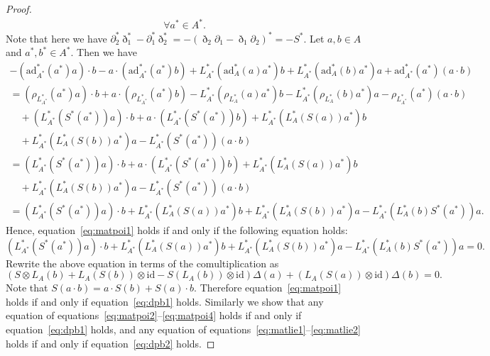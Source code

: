 \documentclass[pdftex]{sigma}
\numberwithin{equation}{section}
\newcommand{\ad}{\mathrm{ad}}
\newcommand{\id}{\mathrm{id}}
\begin{document}
\begin{proof}
\begin{gather*}
 \forall a^* \in A^*.
 \end{gather*}
	Note that here we have $\partial_2^* \eth_1^* - \partial_1^* \eth_2^* = - (\eth_2 \partial_1 - \eth_1 \partial_2)^* = -S^*$.
 Let $a, b \in A$ and $a^*, b^* \in A^*$.
 Then we have
 \begin{gather*}
 -(\ad^*_{A^*}(a^*) a) \cdot b - a \cdot (\ad^*_{A^*}(a^*) b) + L^*_{A^*}(\ad^*_{A}(a)a^*)b + L^*_{A^*}(\ad^*_{A}(b)a^*) a + \ad^*_{A^*}(a^*)(a \cdot b) \\
 = (\rho_{L^*_{A^*}}(a^*) a) \cdot b + a \cdot (\rho_{L^*_{A^*}}(a^*) b) - L^*_{A^*}(\rho_{L^*_A}(a)a^*)b - L^*_{A^*}(\rho_{L^*_A}(b)a^*) a - \rho_{L^*_{A^*}}(a^*)(a \cdot b) \\
 \quad {}+(L^*_{A^*}(S^*(a^*)) a) \cdot b + a \cdot (L^*_{A^*}(S^*(a^*)) b) + L^*_{A^*}(L^*_A(S(a))a^*)b \\
 \quad {}+ L^*_{A^*}(L^*_A(S(b))a^*) a - L^*_{A^*}(S^*(a^*))(a \cdot b) \\
 = (L^*_{A^*}(S^*(a^*)) a) \cdot b + a \cdot (L^*_{A^*}(S^*(a^*)) b) + L^*_{A^*}(L^*_A(S(a))a^*)b \\
 \quad {}+ L^*_{A^*}(L^*_A(S(b))a^*) a - L^*_{A^*}(S^*(a^*))(a \cdot b) \\
 = (L^*_{A^*}(S^*(a^*)) a) \cdot b + L^*_{A^*}(L^*_A(S(a))a^*)b + L^*_{A^*}(L^*_A(S(b))a^*) a - L^*_{A^*}(L^*_A(b)S^*(a^*))a.
 \end{gather*}
 Hence, equation~\eqref{eq:matpoi1} holds if and only if the following equation holds:
 \begin{equation*}
 (L^*_{A^*}(S^*(a^*)) a) \cdot b + L^*_{A^*}(L^*_A(S(a))a^*)b + L^*_{A^*}(L^*_A(S(b))a^*) a - L^*_{A^*}(L^*_A(b)S^*(a^*))a = 0.
 \end{equation*}
 Rewrite the above equation in terms of the comultiplication as
 \begin{equation*}
 (S \otimes L_A(b) + L_A(S(b)) \otimes \id - S(L_A(b)) \otimes \id ) \Delta(a) + ( L_A(S(a)) \otimes \id) \Delta(b) = 0.
 \end{equation*}
 Note that $S(a \cdot b) = a \cdot S(b) + S(a) \cdot b$.
 Therefore equation~\eqref{eq:matpoi1} holds if and only if equation~\eqref{eq:dpb1} holds.
 Similarly we show that any equation of equations~\eqref{eq:matpoi2}--\eqref{eq:matpoi4} holds if and only if equation~\eqref{eq:dpb1} holds,
 and any equation of equations~\eqref{eq:matlie1}--\eqref{eq:matlie2} holds if and only if equation~\eqref{eq:dpb2} holds.
\end{proof}
\end{document}
